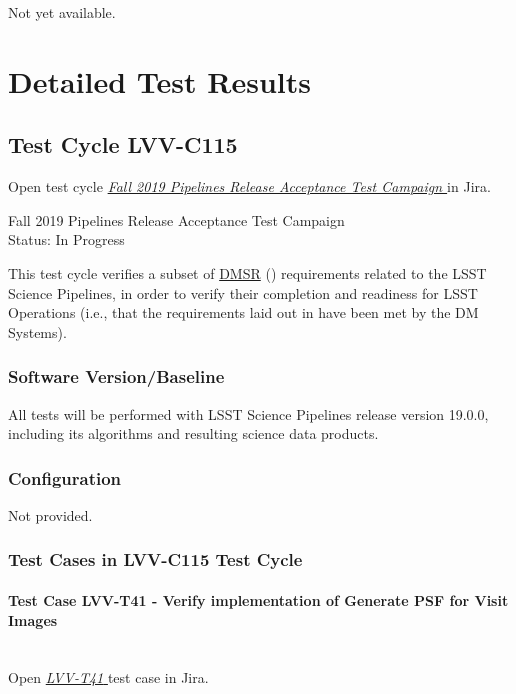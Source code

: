 \documentclass[DM,lsstdraft,STR,toc]{lsstdoc}
\begin{document}
Not yet available.

\newpage
\section{Detailed Test Results}
\label{sect:detailedtestresults}

\subsection{Test Cycle LVV-C115 }

Open test cycle {\it \href{https://jira.lsstcorp.org/secure/Tests.jspa#/testrun/LVV-C115}{ Fall 2019 Pipelines Release Acceptance Test Campaign
}} in Jira.

 Fall 2019 Pipelines Release Acceptance Test Campaign
\\
Status: In Progress

 This test cycle verifies a subset of
\href{https://lse-61.lsst.io/}{DMSR} () requirements related to
the LSST Science Pipelines, in order to verify their completion and
readiness for LSST Operations (i.e., that the requirements laid out in
 have been met by the DM Systems).


\subsubsection{Software Version/Baseline}
 All tests will be performed with LSST Science Pipelines release version
19.0.0, including its algorithms and resulting science data products.~


\subsubsection{Configuration}
Not provided.

\subsubsection{Test Cases in LVV-C115 Test Cycle}

\paragraph{Test Case LVV-T41 -  Verify implementation of Generate PSF for Visit Images
 }\mbox{}\\

Open  \href{https://jira.lsstcorp.org/secure/Tests.jspa#/testCase/LVV-T41}{\textit{ LVV-T41 } }
test case in Jira.
\end{document}
